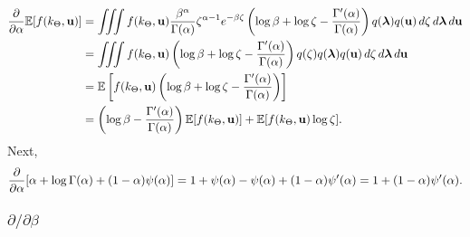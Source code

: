 \documentclass{mprop}
\theoremstyle{definition}
\begin{document}
\[
  \begin{split}
    \frac{\partial}{\partial\alpha}\mathbb{E}[f(k_\Theta, \mathbf{u})] &= \iiint f(k_\Theta, \mathbf{u})
    \frac{\beta^\alpha}{\Gamma(\alpha)}\zeta^{\alpha - 1}e^{-\beta\zeta} \left(
      \log\beta + \log\zeta - \frac{\Gamma'(\alpha)}{\Gamma(\alpha)} \right)
    q(\bm\lambda) q(\mathbf{u})\,d\zeta\,d\bm\lambda\,d\mathbf{u} \\
    &= \iiint f(k_\Theta, \mathbf{u}) \left(\log\beta + \log\zeta -
      \frac{\Gamma'(\alpha)}{\Gamma(\alpha)} \right) q(\zeta) q(\bm\lambda)
    q(\mathbf{u})\,d\zeta\,d\bm\lambda\,d\mathbf{u} \\
    &= \mathbb{E} \left[ f(k_\Theta, \mathbf{u}) \left(\log\beta + \log\zeta -
        \frac{\Gamma'(\alpha)}{\Gamma(\alpha)} \right) \right] \\
    &= \left( \log\beta - \frac{\Gamma'(\alpha)}{\Gamma(\alpha)}
    \right)\mathbb{E}[f(k_\Theta, \mathbf{u})] + \mathbb{E}[f(k_\Theta,
    \mathbf{u})\log\zeta].
  \end{split}
\]
Next,
\[ \frac{\partial}{\partial\alpha} [\alpha + \log\Gamma(\alpha) + (1 - \alpha)\psi(\alpha)] =
  1 + \psi(\alpha) - \psi(\alpha) + (1 - \alpha)\psi'(\alpha) = 1 + (1 -
  \alpha)\psi'(\alpha). \]

\subsubsection{$\partial/\partial\beta$}
\end{document}
